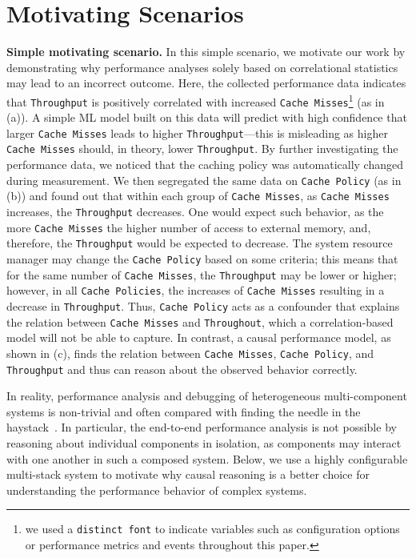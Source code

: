 \section{Motivating Scenarios}
\label{sec:motivation}


\noindent
\textbf{Simple motivating scenario.} In this simple scenario, we motivate our work by demonstrating why performance analyses solely based on correlational statistics may lead to an incorrect outcome. Here, the collected performance data indicates that \texttt{Throughput} is positively correlated with increased \texttt{Cache Misses}\footnote{we used a \texttt{distinct font} to indicate variables such as configuration options or performance metrics and events throughout this paper.} (as in  (a)). A simple ML model built on this data will predict with high confidence that larger \texttt{Cache Misses} leads to higher \texttt{Throughput}---this is misleading as higher \texttt{Cache Misses} should, in theory, lower \texttt{Throughput}. By further investigating the performance data, we noticed that the caching policy was automatically changed during measurement. We then segregated the same data on \texttt{Cache Policy} (as in~ (b)) and found out that within each group of \texttt{Cache Misses}, as \texttt{Cache Misses} increases, the \texttt{Throughput} decreases. One would expect such behavior, as the more \texttt{Cache Misses} the higher number of access to external memory, and, therefore, the \texttt{Throughput} would be expected to decrease. The system resource manager may change the \texttt{Cache Policy} based on some criteria; this means that for the same number of \texttt{Cache Misses}, the \texttt{Throughput} may be lower or higher; however, in all \texttt{Cache Policies}, the increases of \texttt{Cache Misses} resulting in a decrease in \texttt{Throughput}. Thus, \texttt{Cache Policy} acts as a confounder that explains the relation between \texttt{Cache Misses} and \texttt{Throughout}, which a correlation-based model will not be able to capture. In contrast, a causal performance model, as shown in (c), finds the relation between \texttt{Cache Misses}, \texttt{Cache Policy}, and \texttt{Throughput} and thus can reason about the observed behavior correctly. 

In reality, performance analysis and debugging of heterogeneous multi-component systems is non-trivial and often compared with finding the needle in the haystack~\cite{whitaker2004configuration}. In particular, the end-to-end performance analysis is not possible by reasoning about individual components in isolation, as components may interact with one another in such a composed system. Below, we use a highly configurable multi-stack system to motivate why causal reasoning is a better choice for understanding the performance behavior of complex systems. 

